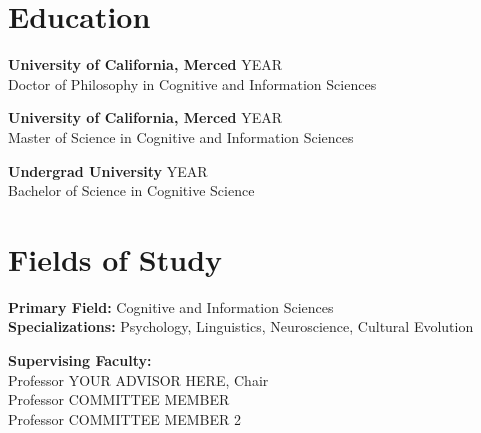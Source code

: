 \documentclass[12pt, oneside]{report}
\begin{document}
\begin{singlespacing}

\section*{Education}
\noindent
\textbf{University of California, Merced} \hfill YEAR \\
Doctor of Philosophy in Cognitive and Information Sciences

\vspace{0.1in}
\noindent
\textbf{University of California, Merced} \hfill YEAR \\
Master of Science in Cognitive and Information Sciences

\vspace{0.1in}
\noindent
\textbf{Undergrad University} \hfill YEAR \\
Bachelor of Science in Cognitive Science

\section*{Fields of Study}
\noindent
\textbf{Primary Field:} Cognitive and Information Sciences \\
\textbf{Specializations:} Psychology, Linguistics, Neuroscience, Cultural Evolution

\vspace{0.2in}
\noindent
\textbf{Supervising Faculty:} \\
Professor YOUR ADVISOR HERE, Chair \\
Professor COMMITTEE MEMBER\\
Professor COMMITTEE MEMBER 2

\end{singlespacing}
\clearpage

\newpage
{} %
\thispagestyle{plain} %
\end{document}
